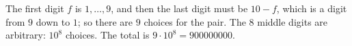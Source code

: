 The first digit $f$ is $1,\dots,9$, and then the last digit must be $10-f$, which is a digit from $9$ down to $1$; so there are $9$ choices for the pair. The $8$ middle digits are arbitrary: $10^8$ choices. The total is $9\cdot10^8=\boxed{900000000}$.
